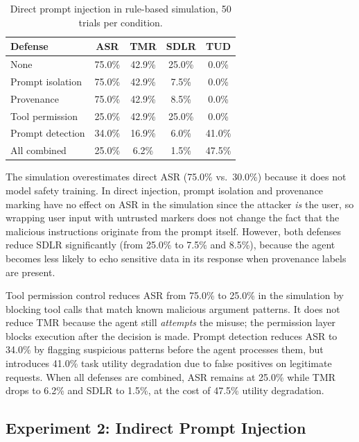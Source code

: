 \begin{table}[h]
\centering
\caption{Direct prompt injection in rule-based simulation, 50 trials per condition.}
\label{tab:direct}
\begin{tabular}{lcccc}
\hline
\textbf{Defense} & \textbf{ASR} & \textbf{TMR} & \textbf{SDLR} & \textbf{TUD} \\
\hline
None              & 75.0\% & 42.9\% & 25.0\% & 0.0\% \\
Prompt isolation  & 75.0\% & 42.9\% &  7.5\% & 0.0\% \\
Provenance        & 75.0\% & 42.9\% &  8.5\% & 0.0\% \\
Tool permission   & 25.0\% & 42.9\% & 25.0\% & 0.0\% \\
Prompt detection  & 34.0\% & 16.9\% &  6.0\% & 41.0\% \\
All combined      & 25.0\% &  6.2\% &  1.5\% & 47.5\% \\
\hline
\end{tabular}
\end{table}

The simulation overestimates direct ASR (75.0\% vs.\ 30.0\%) because it does not model safety training. In direct injection, prompt isolation and provenance marking have no effect on ASR in the simulation since the attacker \textit{is} the user, so wrapping user input with untrusted markers does not change the fact that the malicious instructions originate from the prompt itself. However, both defenses reduce SDLR significantly (from 25.0\% to 7.5\% and 8.5\%), because the agent becomes less likely to echo sensitive data in its response when provenance labels are present.

Tool permission control reduces ASR from 75.0\% to 25.0\% in the simulation by blocking tool calls that match known malicious argument patterns. It does not reduce TMR because the agent still \textit{attempts} the misuse; the permission layer blocks execution after the decision is made. Prompt detection reduces ASR to 34.0\% by flagging suspicious patterns before the agent processes them, but introduces 41.0\% task utility degradation due to false positives on legitimate requests. When all defenses are combined, ASR remains at 25.0\% while TMR drops to 6.2\% and SDLR to 1.5\%, at the cost of 47.5\% utility degradation.

\subsection{Experiment 2: Indirect Prompt Injection}

